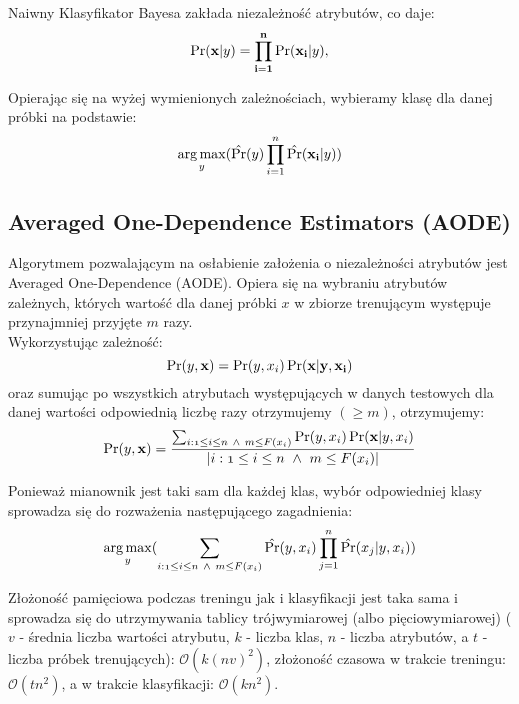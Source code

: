 \documentclass[16]{article}
\begin{document}
Naiwny Klasyfikator Bayesa zakłada niezależność atrybutów, co daje:
\begin{equation}
\label{BayesEquation}
\Pr(\bf{x}|\mathnormal{y}) =  \prod_{i=1}^{n} \Pr(\bf{x_{i}}|\mathnormal{y}),
\end{equation} 

Opierając się na wyżej wymienionych zależnościach, wybieramy klasę dla danej próbki na podstawie:
\begin{equation}
 \operatorname*{arg\,max}_\mathnormal{y} (\hat{\Pr}(\mathnormal{y}) \prod_{i=1}^{n} \hat{\Pr}(\bf{x_{i}}|\mathnormal{y}))
\end{equation} 

\subsection{Averaged One-Dependence Estimators (AODE)}
Algorytmem pozwalającym na osłabienie założenia o niezależności atrybutów jest Averaged One-Dependence (AODE).
Opiera się na wybraniu atrybutów zależnych, których wartość dla danej próbki $x$ w zbiorze trenującym występuje przynajmniej przyjęte $m$ razy. \\

Wykorzystując zależność:
\begin{equation}
\Pr(\mathnormal{y},\bf{x})=\Pr(\mathnormal{y, x_{i}})\Pr(\mathnormal{\bf{x}|y, x_{i}})
\end{equation} 
oraz sumując po wszystkich atrybutach występujących w danych testowych dla danej wartości odpowiednią liczbę razy otrzymujemy $(\geq m)$, otrzymujemy:
\begin{equation}
\Pr(\mathnormal{y},\bf{x})=\frac{\sum_{\mathnormal{i:1 \leq i \leq n \ \wedge \ m \leq F(x_{i})} } \Pr(\mathnormal{y, x_{i}})\Pr(\mathnormal{\bf{x}|\mathnormal{y, x_{i}}})}{\mathnormal{|{i:1 \leq i \leq n \ \wedge \ m \leq F(x_{i})}|}}
\end{equation} 

Ponieważ mianownik jest taki sam dla każdej klas, wybór odpowiedniej klasy sprowadza się do rozważenia następującego zagadnienia:
\begin{equation}
 \label{AOENWzor}
 \operatorname*{arg\,max}_\mathnormal{y} (\sum_{\mathnormal{i:1 \leq i \leq n \ \wedge \ m \leq F(x_{i})} } \hat{\Pr}(\mathnormal{y, x_{i}})\prod_{j=1}^{n} \hat{\Pr}(\mathnormal{x_{j}|y, x_{i}}))
\end{equation} 

Złożoność pamięciowa podczas treningu jak i klasyfikacji jest taka sama i sprowadza się do utrzymywania tablicy trójwymiarowej (albo pięciowymiarowej) ($v$ - średnia liczba wartości atrybutu, $k$ - liczba klas, $n$ - liczba atrybutów, a $t$ - liczba próbek trenujących): $\mathcal{O}(k(nv)^{2})$, złożoność czasowa w trakcie treningu: $\mathcal{O}(tn^{2})$, a w trakcie klasyfikacji: $\mathcal{O}(kn^{2})$. \\
\end{document}
